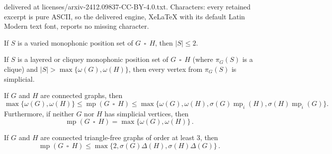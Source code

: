 \documentclass[10pt,a4paper]{amsart}
\DeclareMathOperator {\mono} {mp}
\DeclareMathOperator{\cp}{\,\square\,}
\begin{document}
delivered at licenses/arxiv-2412.09837-CC-BY-4.0.txt. Characters: every retained excerpt is pure ASCII, so the delivered engine, XeLaTeX with its default Latin Modern text font, reports no missing character.
\begin{corollary}\label{cor:varied sets are small}
If $S$ is a varied monophonic position set of $G \cp H$, then $|S| \leq 2$.
\end{corollary}

\begin{lemma}
\label{lem:simplicial vertices}
If $S$ is a layered or cliquey monophonic position set of $G \cp H$ (where $\pi _G(S)$ is a clique) and $|S| > \max \{ \omega (G),\omega (H)\} $, then every vertex from $\pi _G(S)$ is simplicial.
\end{lemma}

\begin{theorem} 
\label{thm:general bounds}
If $G$ and $H$ are connected graphs, then $$\max\{\omega(G), \omega(H)\}\leq \mono (G \cp H) \leq \max \{ \omega (G), \omega (H), \sigma (G) \mono_i(H), \sigma (H) \mono_i(G)\}.$$ 
    Furthermore, if neither $G$ nor $H$ has simplicial vertices, then $$\mono (G \cp H) = \max \{ \omega (G), \omega (H)\}\,.$$    
\end{theorem}

\begin{theorem}
\label{thm:bipartite}
If $G$ and $H$ are connected triangle-free graphs of order at least $3$, then 
$$\mono(G\cp H)\leq\max\{2, \sigma(G)\Delta(H), \sigma(H)\Delta(G)\}\,.$$ 
\end{theorem}
\end{document}
